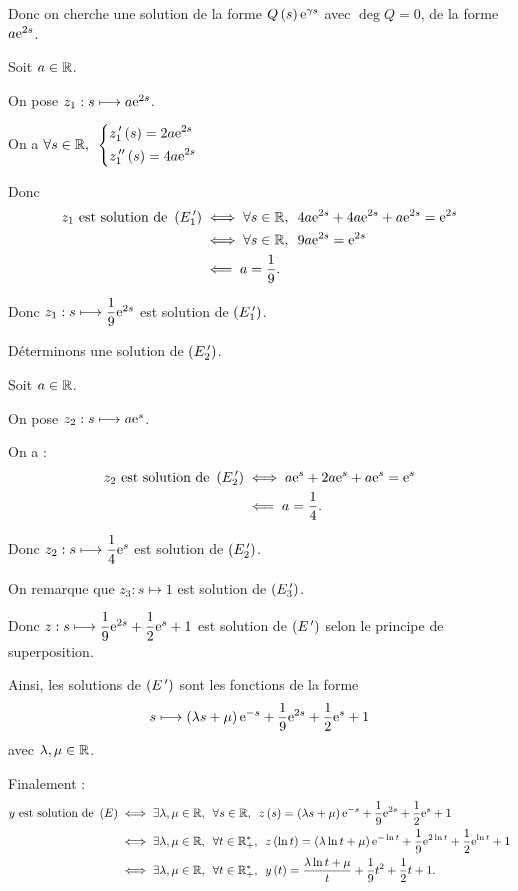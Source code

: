 \begin{corr}
\begin{brouill}
Donc on cherche une solution de la forme \(Q\left(s\right)\mathrm{e}^{\gamma s}\) avec \(\deg Q=0\), \cad de la forme \(a\mathrm{e}^{2s}\).
\end{brouill}

Soit \(a\in\mathbb{R}\).

On pose \(z_1:s\longmapsto a\mathrm{e}^{2s}\).

On a \(\quantifs{\forall s\in\R}\begin{dcases}
z_1\prim\paren{s}=2a\e{2s} \\
z_1\seconde\paren{s}=4a\e{2s}
\end{dcases}\)

Donc \[\begin{aligned}
z_1\text{ est solution de }\paren{E_1\prim}&\ssi\quantifs{\forall s\in\R}4a\e{2s}+4a\e{2s}+a\e{2s}=\e{2s} \\
&\ssi\quantifs{\forall s\in\R}9a\e{2s}=\e{2s} \\
&\impr a=\dfrac{1}{9}.
\end{aligned}\]

Donc \(z_1:s\longmapsto\dfrac{1}{9}\mathrm{e}^{2s}\) est solution de \(\left(E_1^{\,\prime}\right)\).

Déterminons une solution de \(\left(E_2^{\,\prime}\right)\).

Soit \(a\in\mathbb{R}\).

On pose \(z_2:s\longmapsto a\mathrm{e}^{s}\).

On a : \[\begin{aligned}
z_2\text{ est solution de }\left(E_2^{\,\prime}\right)&\iff a\mathrm{e}^{s}+2a\mathrm{e}^{s}+a\mathrm{e}^{s}=\mathrm{e}^{s} \\
&\impliedby a=\dfrac{1}{4}.
\end{aligned}\]

Donc \(z_2:s\longmapsto\dfrac{1}{4}\mathrm{e}^{s}\) est solution de \(\left(E_2^{\,\prime}\right)\).

On remarque que \(z_3:s\mapsto1\) est solution de \(\left(E_3^{\,\prime}\right)\).

Donc \(z:s\longmapsto\dfrac{1}{9}\mathrm{e}^{2s}+\dfrac{1}{2}\mathrm{e}^{s}+1\) est solution de \(\left(E^{\,\prime}\right)\) selon le principe de superposition.

Ainsi, les solutions de \(\left(E^{\,\prime}\right)\) sont les fonctions de la forme \[s\longmapsto\left(\lambda s+\mu\right)\mathrm{e}^{-s}+\dfrac{1}{9}\mathrm{e}^{2s}+\dfrac{1}{2}\mathrm{e}^{s}+1\] avec \(\lambda,\mu\in\mathbb{R}\).

Finalement : \[\begin{aligned}
y\text{ est solution de }\paren{E}&\ssi\quantifs{\exists\lambda,\mu\in\R;\forall s\in\R}z\paren{s}=\paren{\lambda s+\mu}\e{-s}+\dfrac{1}{9}\e{2s}+\dfrac{1}{2}\e{s}+1 \\
&\ssi\quantifs{\exists\lambda,\mu\in\R;\forall t\in\Rps}z\paren{\ln t}=\paren{\lambda\ln t+\mu}\e{-\ln t}+\dfrac{1}{9}\e{2\ln t}+\dfrac{1}{2}\e{\ln t}+1 \\
&\ssi\quantifs{\exists\lambda,\mu\in\R;\forall t\in\Rps}y\paren{t}=\dfrac{\lambda\ln t+\mu}{t}+\dfrac{1}{9}t^2+\dfrac{1}{2}t+1.
\end{aligned}\]
\end{corr}

